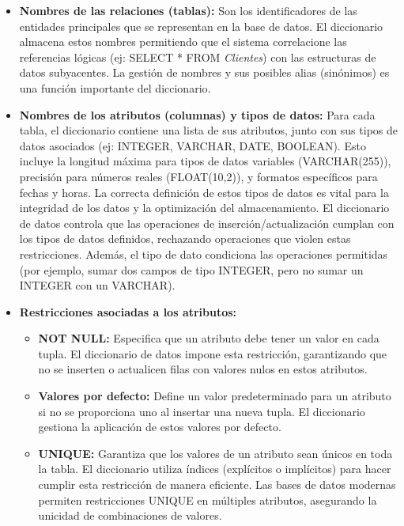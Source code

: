 \begin{itemize}
    \item \textbf{Nombres de las relaciones (tablas):}  Son los identificadores de las entidades principales que se representan en la base de datos. El diccionario almacena estos nombres permitiendo que el sistema correlacione las referencias lógicas (ej: SELECT * FROM \textit{Clientes}) con las estructuras de datos subyacentes. La gestión de nombres y sus posibles alias (sinónimos) es una función importante del diccionario.

    \item \textbf{Nombres de los atributos (columnas) y tipos de datos:}  Para cada tabla, el diccionario contiene una lista de sus atributos, junto con sus tipos de datos asociados (ej: INTEGER, VARCHAR, DATE, BOOLEAN). Esto incluye la longitud máxima para tipos de datos variables (VARCHAR(255)), precisión para números reales (FLOAT(10,2)), y formatos específicos para fechas y horas. La correcta definición de estos tipos de datos es vital para la integridad de los datos y la optimización del almacenamiento. El diccionario de datos controla que las operaciones de inserción/actualización cumplan con los tipos de datos definidos, rechazando operaciones que violen estas restricciones. Además, el tipo de dato condiciona las operaciones permitidas (por ejemplo, sumar dos campos de tipo INTEGER, pero no sumar un INTEGER con un VARCHAR).

    \item \textbf{Restricciones asociadas a los atributos:}
    \begin{itemize}
        \item \textbf{NOT NULL:} Especifica que un atributo debe tener un valor en cada tupla. El diccionario de datos impone esta restricción, garantizando que no se inserten o actualicen filas con valores nulos en estos atributos.

        \item \textbf{Valores por defecto:}  Define un valor predeterminado para un atributo si no se proporciona uno al insertar una nueva tupla.  El diccionario gestiona la aplicación de estos valores por defecto.

        \item \textbf{UNIQUE:}  Garantiza que los valores de un atributo sean únicos en toda la tabla. El diccionario utiliza índices (explícitos o implícitos) para hacer cumplir esta restricción de manera eficiente.  Las bases de datos modernas permiten restricciones UNIQUE en múltiples atributos, asegurando la unicidad de combinaciones de valores.


\end{itemize}
\end{itemize}
